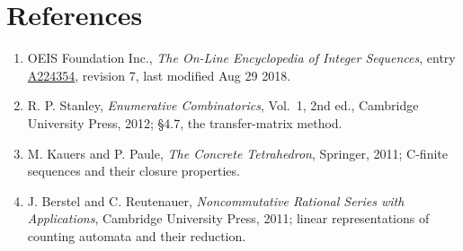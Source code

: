 \documentclass[11pt]{article}
\theoremstyle{definition}
\begin{document}
\section{References}

\begin{enumerate}

\item OEIS Foundation Inc., \emph{The On-Line Encyclopedia of Integer Sequences}, entry \href{https://oeis.org/A224354}{A224354}, revision 7, last modified Aug 29 2018.

\item R. P. Stanley, \emph{Enumerative Combinatorics}, Vol.~1, 2nd ed., Cambridge University Press, 2012; \S4.7, the transfer-matrix method.

\item M. Kauers and P. Paule, \emph{The Concrete Tetrahedron}, Springer, 2011; C-finite sequences and their closure properties.

\item J. Berstel and C. Reutenauer, \emph{Noncommutative Rational Series with Applications}, Cambridge University Press, 2011; linear representations of counting automata and their reduction.

\end{enumerate}
\end{document}
